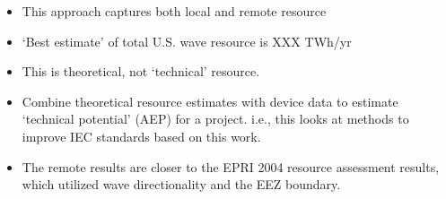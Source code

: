 \begin{itemize}
\item This approach captures both local and remote resource
\item ‘Best estimate’ of total U.S. wave resource is XXX TWh/yr
\item This is theoretical, not ‘technical’ resource.
\item Combine theoretical resource estimates with device data to estimate ‘technical potential’ (AEP) for a project. i.e., this looks at methods to improve IEC standards based on this work.
\item The remote results are closer to the EPRI 2004 resource assessment results, which utilized wave directionality and the EEZ boundary.
\end{itemize}


